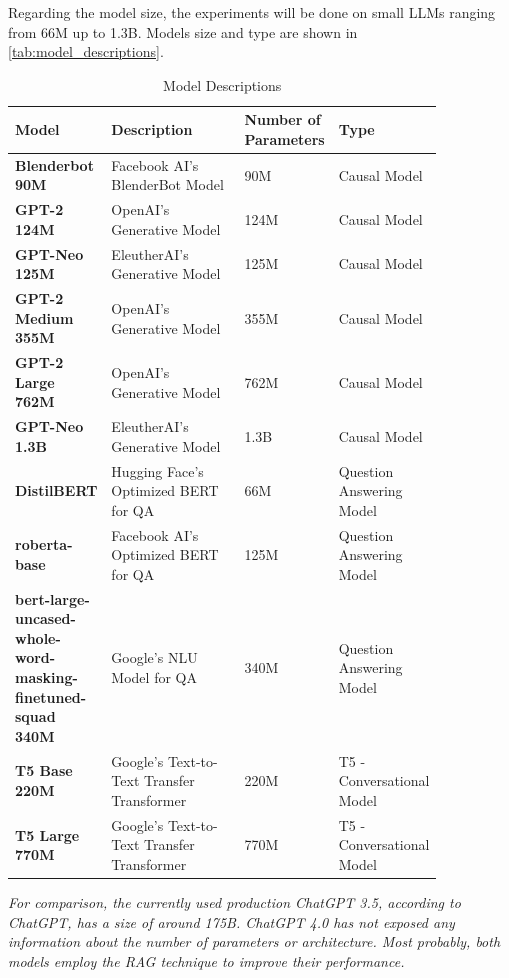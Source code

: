 \documentclass{wseas}
\begin{document}
Regarding the model size, the experiments will be done on small LLMs
ranging from 66M up to 1.3B. Models size and type are shown in \autoref{tab:model_descriptions}.
\begin{table}[htbp]
  \centering
  \caption{Model Descriptions} %
  \label{tab:model_descriptions}  %
  \begin{tabular}{|p{0.2\linewidth}|p{0.35\linewidth}|p{0.15\linewidth}|p{0.15\linewidth}|}
  \hline
  \textbf{Model} & \textbf{Description} & \textbf{Number of Parameters} & \textbf{Type} \\
  \hline
  \textbf{Blenderbot 90M} & Facebook AI's BlenderBot Model & 90M & Causal Model \\
  \hline
  \textbf{GPT-2 124M} & OpenAI's Generative Model & 124M & Causal Model \\
  \hline
  \textbf{GPT-Neo 125M} & EleutherAI's Generative Model & 125M & Causal Model \\
  \hline
  \textbf{GPT-2 Medium 355M} & OpenAI's Generative Model & 355M & Causal Model \\
  \hline
  \textbf{GPT-2 Large 762M} & OpenAI's Generative Model & 762M & Causal Model \\
  \hline
  \textbf{GPT-Neo 1.3B} & EleutherAI's Generative Model & 1.3B & Causal Model \\
  \hline
  \textbf{DistilBERT} & Hugging Face's Optimized BERT for QA & 66M & Question Answering Model \\
  \hline
  \textbf{roberta-base} & Facebook AI's Optimized BERT for QA & 125M & Question Answering Model \\
  \hline
  \textbf{bert-large-uncased-whole-word-masking-finetuned-squad 340M} & Google's NLU Model for QA & 340M & Question Answering Model \\
  \hline
  \textbf{T5 Base 220M} & Google's Text-to-Text Transfer Transformer & 220M & T5 - Conversational Model \\
  \hline
  \textbf{T5 Large 770M} & Google's Text-to-Text Transfer Transformer & 770M & T5 - Conversational Model \\
  \hline
  \end{tabular}
\end{table}  

\emph{For comparison, the currently used production ChatGPT 3.5,
according to ChatGPT, has a size of around 175B. ChatGPT 4.0 has not
exposed any information about the number of parameters or architecture.
Most probably, both models employ the RAG technique to improve their
performance.}
\end{document}

